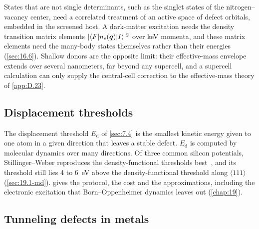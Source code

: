 States that are not single determinants, such as the singlet states of the nitrogen--vacancy center, need a correlated treatment of an active space of defect orbitals, embedded in the screened host. A dark-matter excitation needs the density transition matrix elements $|\langle F|n_e(\bm{q})|I\rangle|^2$ over keV momenta, and these matrix elements need the many-body states themselves rather than their energies (\cref{sec:16.6}). Shallow donors are the opposite limit: their effective-mass envelope extends over several nanometers, far beyond any supercell, and a supercell calculation can only supply the central-cell correction to the effective-mass theory of \cref{app:D.23}.

\subsection{Displacement thresholds}

The displacement threshold $E_{\mathrm{d}}$ of \cref{sec:7.4} is the smallest kinetic energy given to one atom in a given direction that leaves a stable defect. $E_{\mathrm{d}}$ is computed by molecular dynamics over many directions. Of three common silicon potentials, Stillinger--Weber reproduces the density-functional thresholds best~\cite{kadribasic2018directional}, and its threshold still lies 4 to \SI{6}{eV} above the density-functional threshold along $\langle111\rangle$ (\cref{sec:19.1-md}).  gives the protocol, the cost and the approximations, including the electronic excitation that Born--Oppenheimer dynamics leaves out (\cref{chap:19}).

\subsection{Tunneling defects in metals}

